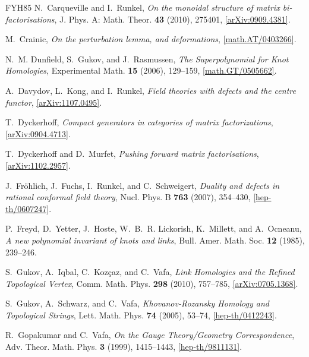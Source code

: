 \documentclass{compositio}
\theoremstyle{definition}
\numberwithin{equation}{section}
\begin{document}
\begin{thebibliography}{FYH{\etalchar{+}}85}
N.~Carqueville and I.~Runkel, \emph{On the monoidal structure of matrix bi-factorisations}, J. Phys.
  A: Math. Theor. \textbf{43} (2010), 275401,
  \href{http://arxiv.org/abs/0909.4381}{[arXiv:0909.4381]}.

M.~Crainic, \emph{On the perturbation lemma, and deformations},
  \href{http://arxiv.org/abs/math/0403266}{[math.AT/0403266]}.

N.~M. Dunfield, S.~Gukov, and J.~Rasmussen, \emph{The {S}uperpolynomial for
  {K}not {H}omologies}, Experimental Math. \textbf{15} (2006), 129--159,
  \href{http://arxiv.org/abs/math/0505662}{[math.GT/0505662]}.

A.~Davydov, L.~Kong, and I.~Runkel, \emph{Field theories with defects and the
  centre functor}, \href{http://arxiv.org/abs/1107.0495}{[arXiv:1107.0495]}.
  
T.~Dyckerhoff, \emph{Compact generators in categories of matrix factorizations},
  \href{http://arxiv.org/abs/0904.4713}{[arXiv:0904.4713]}. 

T.~Dyckerhoff and D.~Murfet, \emph{Pushing forward matrix factorisations},
  \href{http://arxiv.org/abs/1102.2957}{[arXiv:1102.2957]}.

J.~Fr\"ohlich, J.~Fuchs, I.~Runkel, and C.~Schweigert, \emph{Duality and
  defects in rational conformal field theory}, Nucl. Phys. B \textbf{763}
  (2007), 354--430,
  \href{http://arxiv.org/abs/hep-th/0607247}{[hep-th/0607247]}.

P.~Freyd, D.~Yetter, J.~Hoste, W.~B.~R. Lickorish, K.~Millett, and A.~Ocneanu,
  \emph{A new polynomial invariant of knots and links}, Bull. Amer. Math. Soc.
  \textbf{12} (1985), 239--246.

S.~Gukov, A.~Iqbal, C.~Koz\c{c}az, and C.~Vafa, \emph{Link {H}omologies and the
  {R}efined {T}opological {V}ertex}, Comm. Math. Phys. \textbf{298} (2010),
  757--785, \href{http://arxiv.org/abs/0705.1368}{[arXiv:0705.1368]}.

S.~Gukov, A.~Schwarz, and C.~Vafa, \emph{Khovanov-{R}ozansky {H}omology and
  {T}opological {S}trings}, Lett. Math. Phys. \textbf{74} (2005), 53--74,
  \href{http://arxiv.org/abs/hep-th/0412243}{[hep-th/0412243]}.

R.~Gopakumar and C.~Vafa, \emph{On the {G}auge {T}heory/{G}eometry
  {C}orrespondence}, Adv. Theor. Math. Phys. \textbf{3} (1999), 1415--1443,
  \href{http://arxiv.org/abs/hep-th/9811131}{[hep-th/9811131]}.


\end{thebibliography}
\end{document}
